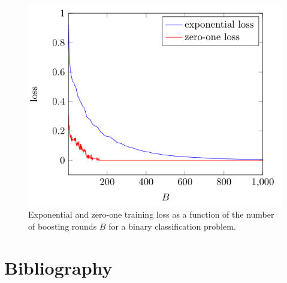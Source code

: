 \documentclass{beamer}
\begin{document}
\begin{frame}
    \begin{figure}
        \includegraphics[width=0.7\linewidth]{F811Kroese}
        \caption{Exponential and zero-one training loss as a function of the number of boosting rounds $B$ for a binary classification problem. \cite{kroese2020}}
    \end{figure}
\end{frame}

\section{Bibliography}


\end{document}
